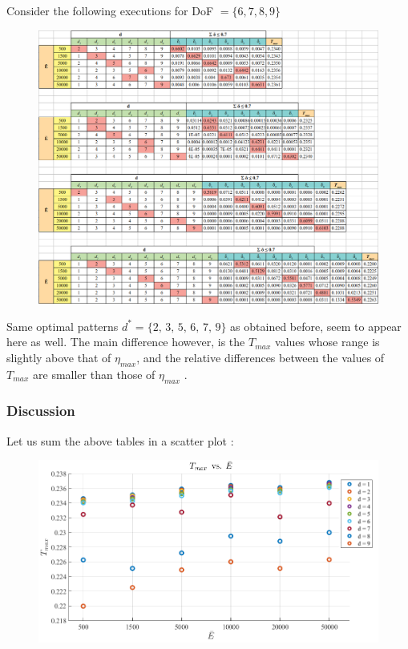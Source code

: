 \documentclass[12pt]{article}
\numberwithin{equation}{section}
\begin{document}
\begin{flushleft}
\newpage
Consider the following executions for DoF $= \{6, 7, 8, 9\}$ 
\begin{figure}[H] \label{T_d_6} 
\centering
\includegraphics[width=1.15 \linewidth, center]{T_07_c_true.png}
\end{figure}

Same optimal patterns $d^* = \{2, \, 3, \, 5, \, 6, \, 7, \, 9  \}$ as obtained before, seem to appear here as well. The main difference however, is the $T_{max}$ values whose range is slightly above that of $\eta_{max}$, and the relative differences between the values of $T_{max}$ are smaller than those of $\eta_{max}$ . 

\newpage

\subsubsection{Discussion}
Let us sum the above tables in a scatter plot :

\begin{figure}[H]
\centering
\includegraphics[width=1.0 \linewidth, center]{T_max_table_true.png}
\end{figure}


\end{flushleft}
\end{document}

